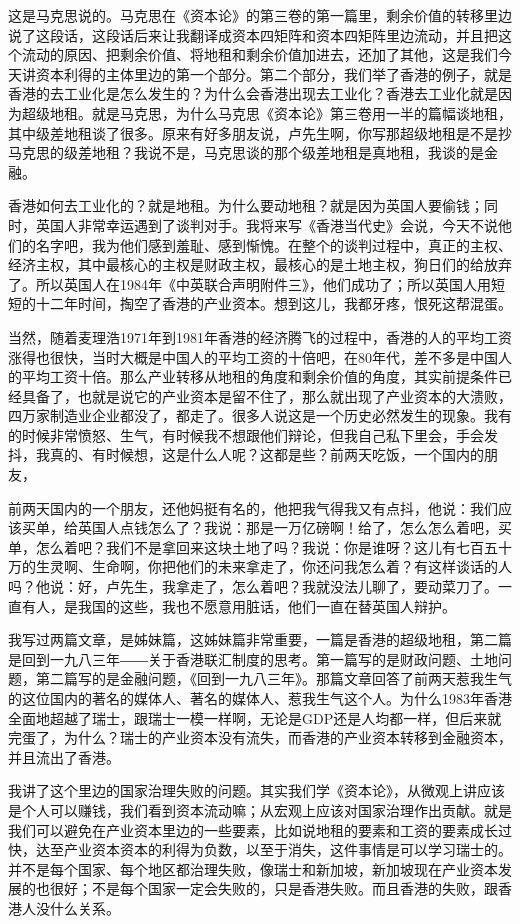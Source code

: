\documentclass[UTF8, 12pt, a4paper]{ctexrep}
\begin{document}
这是马克思说的。马克思在《资本论》的第三卷的第一篇里，剩余价值的转移里边说了这段话，这段话后来让我翻译成资本四矩阵和资本四矩阵里边流动，并且把这个流动的原因、把剩余价值、将地租和剩余价值加进去，还加了其他，这是我们今天讲资本利得的主体里边的第一个部分。第二个部分，我们举了香港的例子，就是香港的去工业化是怎么发生的？为什么会香港出现去工业化？香港去工业化就是因为超级地租。就是马克思，为什么马克思《资本论》第三卷用一半的篇幅谈地租，其中级差地租谈了很多。原来有好多朋友说，卢先生啊，你写那超级地租是不是抄马克思的级差地租？我说不是，马克思谈的那个级差地租是真地租，我谈的是金融。

香港如何去工业化的？就是地租。为什么要动地租？就是因为英国人要偷钱；同时，英国人非常幸运遇到了谈判对手。我将来写《香港当代史》会说，今天不说他们的名字吧，我为他们感到羞耻、感到惭愧。在整个的谈判过程中，真正的主权、经济主权，其中最核心的主权是财政主权，最核心的是土地主权，狗日们的给放弃了。所以英国人在1984年《中英联合声明附件三》，他们成功了；所以英国人用短短的十二年时间，掏空了香港的产业资本。想到这儿，我都牙疼，恨死这帮混蛋。

当然，随着麦理浩1971年到1981年香港的经济腾飞的过程中，香港的人的平均工资涨得也很快，当时大概是中国人的平均工资的十倍吧，在80年代，差不多是中国人的平均工资十倍。那么产业转移从地租的角度和剩余价值的角度，其实前提条件已经具备了，也就是说它的产业资本是留不住了，那么就出现了产业资本的大溃败，四万家制造业企业都没了，都走了。很多人说这是一个历史必然发生的现象。我有的时候非常愤怒、生气，有时候我不想跟他们辩论，但我自己私下里会，手会发抖，我真的、有时候想，这是什么人呢？这都是些？前两天吃饭，一个国内的朋友，

前两天国内的一个朋友，还他妈挺有名的，他把我气得我又有点抖，他说：我们应该买单，给英国人点钱怎么了？我说：那是一万亿磅啊！给了，怎么怎么着吧，买单，怎么着吧？我们不是拿回来这块土地了吗？我说：你是谁呀？这儿有七百五十万的生灵啊、生命啊，你把他们的未来拿走了，你还问我怎么着？有这样谈话的人吗？他说：好，卢先生，我拿走了，怎么着吧？我就没法儿聊了，要动菜刀了。一直有人，是我国的这些，我也不愿意用脏话，他们一直在替英国人辩护。

我写过两篇文章，是姊妹篇，这姊妹篇非常重要，一篇是香港的超级地租，第二篇是回到一九八三年――关于香港联汇制度的思考。第一篇写的是财政问题、土地问题，第二篇写的是金融问题，《回到一九八三年》。那篇文章回答了前两天惹我生气的这位国内的著名的媒体人、著名的媒体人、惹我生气这个人。为什么1983年香港全面地超越了瑞士，跟瑞士一模一样啊，无论是GDP还是人均都一样，但后来就完蛋了，为什么？瑞士的产业资本没有流失，而香港的产业资本转移到金融资本，并且流出了香港。

我讲了这个里边的国家治理失败的问题。其实我们学《资本论》，从微观上讲应该是个人可以赚钱，我们看到资本流动嘛；从宏观上应该对国家治理作出贡献。就是我们可以避免在产业资本里边的一些要素，比如说地租的要素和工资的要素成长过快，达至产业资本资本的利得为负数，以至于消失，这件事情是可以学习瑞士的。并不是每个国家、每个地区都治理失败，像瑞士和新加坡，新加坡现在产业资本发展的也很好；不是每个国家一定会失败的，只是香港失败。而且香港的失败，跟香港人没什么关系。
\end{document}
